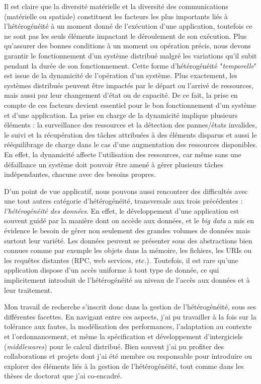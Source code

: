 Il est claire que la diversité matérielle et la diversité des communications (matérielle ou spatiale) constituent les facteurs les plus importants liés à l'hétérogénéité à un moment donné de l'exécution d'une application, toutefois ce ne sont pas les seuls éléments impactant le déroulement de son exécution. Plus qu'assurer des bonnes conditions à un moment ou opération précis, nous devons garantir le fonctionnement d'un système distribué malgré les variations qu'il subit pendant la durée de son fonctionnement. Cette forme d'hétérogénéité "\textit{temporelle}" est issue de la dynamicité de l'opération d'un système. Plus exactement, les systèmes distribués peuvent être impactés par le départ ou l'arrivé de ressources, mais aussi par leur changement d'état ou de capacité. De ce fait, la prise en compte de ces facteurs devient essentiel pour le bon fonctionnement d'un système et d'une application. La prise en charge de la dynamicité implique plusieurs éléments : la surveillance des ressources et la détection des pannes/états invalides, le suivi et la récupération des tâches attribuées à des éléments disparus et aussi le rééquilibrage de charge dans le cas d'une augmentation des ressources disponibles. En effet, la dynamicité affecte l'utilisation des ressources, car même sans une défaillance un système doit pouvoir être amené à gérer plusieurs tâches indépendantes, chacune avec des besoins propres.

D'un point de vue applicatif, nous pouvons aussi rencontrer des difficultés avec une tout autres catégorie d'hétérogénéité, transversale aux trois précédentes :\textit{ l'hétérogénéité des données}. En effet, le développement d'une application est souvent guidé par la manière dont on accède aux données, et le \textit{big data} a mis en évidence le besoin de gérer non seulement des grandes volumes de données mais surtout leur variété. Les données peuvent se présenter sous des abstractions bien connues comme par exemple les objets dans la mémoire, les fichiers, les URIs ou les requêtes distantes (RPC, web services, etc.). Toutefois, il est rare qu'une application dispose d'un accès uniforme à tout type de donnée, ce qui implicitement introduit de l'hétérogénéité au niveau de l'accès aux données et à leur traitement. 

Mon travail de recherche s'inscrit donc dans la gestion de l'hétérogénéité, sous ses différentes facettes. En navigant entre ces aspects, j'ai pu travailler à la fois sur la tolérance aux fautes, la modélisation des performances, l'adaptation au contexte et l'ordonnancement, et même la spécification et développement d'intergiciels (\textit{middlewares}) pour le calcul distribué. Bien souvent j'ai pu profiter des collaborations et projets dont j'ai été membre ou responsable pour introduire ou explorer des éléments liés à la gestion de l'hétérogénéité, tout comme dans les thèses de doctorat que j'ai co-encadré. 

